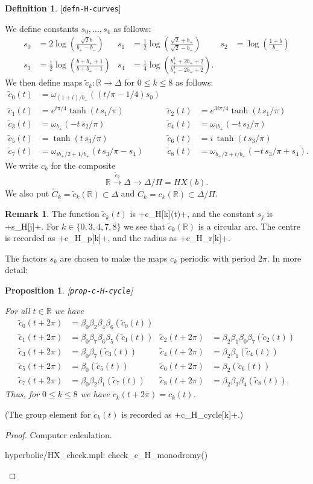 \documentclass[reqno]{amsart}
\newcommand{\lbl}[1]{\label{#1}\textup{[\texttt{#1}]}\par}
\newcommand{\lbl}{\label}
\newcommand{\Dl}        {\Delta}
\newcommand{\bt}        {\beta}
\newcommand{\om}        {\omega}
\newcommand{\xra}       {\xrightarrow}
\newcommand{\R}         {{\mathbb{R}}}
\newcommand{\rt}        {\sqrt{2}}
\newcommand{\tC}	{\widetilde{C}}
\newcommand{\tc}	{\widetilde{c}}
\renewcommand{\:}{\colon}
\newtheorem{proposition}[theorem]{Proposition}
\theoremstyle{definition}
\newtheorem{remark}[theorem]{Remark}
\newtheorem{definition}[theorem]{Definition}
\begin{document}
\begin{definition}\lbl{defn-H-curves}
 We define constants $s_0,\dotsc,s_4$ as follows:
 \begin{align*}
  s_0 &= 2\log\left(\frac{\rt b}{b_+-b_-}\right) &
  s_1 &= \frac{1}{2}\log\left(\frac{\rt+b_+}{\rt-b_+}\right) &
  s_2 &= \log\left(\frac{1+b}{b_-}\right) \\
  s_3 &= \frac{1}{2}\log\left(\frac{b+b_++1}{b+b_+-1}\right) &
  s_4 &= \frac{1}{4}\log\left(\frac{b_+^2+2b_++2}{b_+^2-2b_++2}\right).
 \end{align*}
 We then define maps $\tc_k\:\R\to \Dl$ for $0\leq k\leq 8$ as follows:
 \begin{align*}
  \tc_0(t) &= \om_{(1+i)/b_+}((t/\pi-1/4)s_0) \\
  \tc_1(t) &= e^{i\pi/4}\tanh(t\,s_1/\pi) &
  \tc_2(t) &= e^{3i\pi/4}\tanh(t\,s_1/\pi) \\
  \tc_3(t) &= \om_{b_+}(-t\,s_2/\pi) &
  \tc_4(t) &= \om_{ib_+}(-t\,s_2/\pi) \\
  \tc_5(t) &= \tanh(t\,s_3/\pi) &
  \tc_6(t) &= i\,\tanh(t\,s_3/\pi) \\
  \tc_7(t) &= \om_{ib_+/2+1/b_+}( t\,s_3/\pi - s_4) &
  \tc_8(t) &= \om_{ b_+/2+i/b_+}(-t\,s_3/\pi + s_4).
 \end{align*}
 We write $c_k$ for the composite
 \[ \R \xra{\tc_k} \Dl \xra{} \Dl/\Pi = HX(b). \]
 We also put $\tC_k=\tc_k(\R)\subset \Dl$ and $C_k=c_k(\R)\subset \Dl/\Pi$.
\end{definition}
\begin{remark}
 The function $\tc_k(t)$ is \mcode+c_H[k](t)+, and the constant $s_j$
 is \mcode+s_H[j]+.  For $k\in\{0,3,4,7,8\}$ we see that $\tc_k(\R)$ is
 a circular arc.  The centre is recorded as \mcode+c_H_p[k]+, and the
 radius as \mcode+c_H_r[k]+.
\end{remark}

The factors $s_k$ are chosen to make the maps $c_k$ periodic with
period $2\pi$.  In more detail:
\begin{proposition}\lbl{prop-c-H-cycle}
 For all $t\in\R$ we have
 \begin{align*}
  \tc_0(t+2\pi) &= \bt_0\bt_2\bt_4\bt_6(\tc_0(t)) \\
  \tc_1(t+2\pi) &= \bt_0\bt_7\bt_6\bt_5(\tc_1(t)) &
  \tc_2(t+2\pi) &= \bt_2\bt_1\bt_0\bt_7(\tc_2(t)) \\
  \tc_3(t+2\pi) &= \bt_0\bt_7(\tc_3(t)) &
  \tc_4(t+2\pi) &= \bt_2\bt_1(\tc_4(t)) \\
  \tc_5(t+2\pi) &= \bt_0(\tc_5(t)) &
  \tc_6(t+2\pi) &= \bt_2(\tc_6(t)) \\
  \tc_7(t+2\pi) &= \bt_0\bt_2\bt_1(\tc_7(t)) &
  \tc_8(t+2\pi) &= \bt_2\bt_3\bt_4(\tc_8(t)).
 \end{align*}
 Thus, for $0\leq k\leq 8$ we have $c_k(t+2\pi)=c_k(t)$.
\end{proposition}
(The group element for $\tc_k(t)$ is recorded as \mcode+c_H_cycle[k]+.)
\begin{proof}
 Computer calculation.
 \begin{checks}
  hyperbolic/HX_check.mpl: check_c_H_monodromy()
 \end{checks}
\end{proof}
\end{document}
